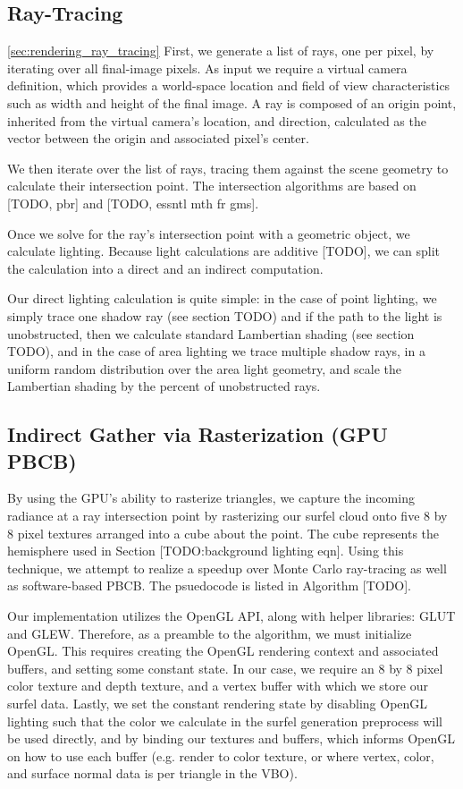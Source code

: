 \subsection{Ray-Tracing}
\ref{sec:rendering_ray_tracing}
First, we generate a list of rays, one per pixel, by iterating over all final-image pixels. As input we require a virtual camera definition, which provides a world-space location and field of view characteristics such as width and height of the final image. A ray is composed of an origin point, inherited from the virtual camera's location, and direction, calculated as the vector between the origin and associated pixel's center.

We then iterate over the list of rays, tracing them against the scene geometry to calculate their intersection point. The intersection algorithms are based on [TODO, pbr] and [TODO, essntl mth fr gms].

Once we solve for the ray's intersection point with a geometric object, we calculate lighting. Because light calculations are additive [TODO], we can split the calculation into a direct and an indirect computation.

Our direct lighting calculation is quite simple: in the case of point lighting, we simply trace one shadow ray (see section TODO) and if the path to the light is unobstructed, then we calculate standard Lambertian shading (see section TODO), and in the case of area lighting we trace multiple shadow rays, in a uniform random distribution over the area light geometry, and scale the Lambertian shading by the percent of unobstructed rays.


\subsection{Indirect Gather via Rasterization (GPU PBCB)}
\label{sec:indirect}
By using the GPU's ability to rasterize triangles, we capture the incoming radiance at a ray intersection point by rasterizing our surfel cloud onto five 8 by 8 pixel textures arranged into a cube about the point. The cube represents the hemisphere used in Section [TODO:background lighting eqn]. Using this technique, we attempt to realize a speedup over Monte Carlo ray-tracing as well as software-based PBCB. The psuedocode is listed in Algorithm [TODO].

Our implementation utilizes the OpenGL API, along with helper libraries: GLUT and GLEW. Therefore, as a preamble to the algorithm, we must initialize OpenGL. This requires creating the OpenGL rendering context and associated buffers, and setting some constant state. In our case, we require an 8 by 8 pixel color texture and depth texture, and a vertex buffer with which we store our surfel data. Lastly, we set the constant rendering state by disabling OpenGL lighting such that the color we calculate in the surfel generation preprocess will be used directly, and by binding our textures and buffers, which informs OpenGL on how to use each buffer (e.g. render to color texture, or where vertex, color, and surface normal data is per triangle in the VBO).

